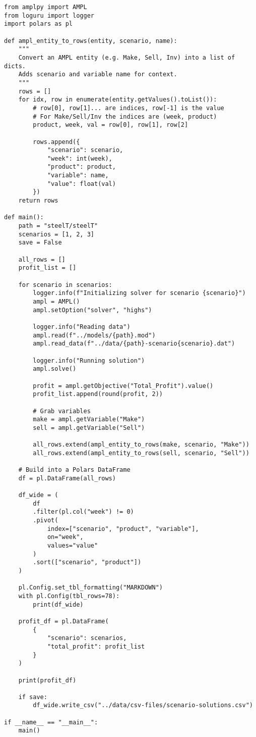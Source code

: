 \begin{verbatim}
from amplpy import AMPL
from loguru import logger
import polars as pl

def ampl_entity_to_rows(entity, scenario, name):
    """
    Convert an AMPL entity (e.g. Make, Sell, Inv) into a list of dicts.
    Adds scenario and variable name for context.
    """
    rows = []
    for idx, row in enumerate(entity.getValues().toList()):
        # row[0], row[1]... are indices, row[-1] is the value
        # For Make/Sell/Inv the indices are (week, product)
        product, week, val = row[0], row[1], row[2]

        rows.append({
            "scenario": scenario,
            "week": int(week),
            "product": product,
            "variable": name,
            "value": float(val)
        })
    return rows

def main():
    path = "steelT/steelT"
    scenarios = [1, 2, 3]
    save = False

    all_rows = []
    profit_list = []

    for scenario in scenarios:
        logger.info(f"Initializing solver for scenario {scenario}")
        ampl = AMPL()
        ampl.setOption("solver", "highs")

        logger.info("Reading data")
        ampl.read(f"../models/{path}.mod")
        ampl.read_data(f"../data/{path}-scenario{scenario}.dat")

        logger.info("Running solution")
        ampl.solve()

        profit = ampl.getObjective("Total_Profit").value()
        profit_list.append(round(profit, 2))

        # Grab variables
        make = ampl.getVariable("Make")
        sell = ampl.getVariable("Sell")

        all_rows.extend(ampl_entity_to_rows(make, scenario, "Make"))
        all_rows.extend(ampl_entity_to_rows(sell, scenario, "Sell"))

    # Build into a Polars DataFrame
    df = pl.DataFrame(all_rows)

    df_wide = (
        df
        .filter(pl.col("week") != 0)
        .pivot(
            index=["scenario", "product", "variable"],
            on="week",
            values="value"
        )
        .sort(["scenario", "product"])
    )

    pl.Config.set_tbl_formatting("MARKDOWN")
    with pl.Config(tbl_rows=78):
        print(df_wide)

    profit_df = pl.DataFrame(
        {
            "scenario": scenarios,
            "total_profit": profit_list
        }
    )

    print(profit_df)

    if save:
        df_wide.write_csv("../data/csv-files/scenario-solutions.csv")

if __name__ == "__main__":
    main()

\end{verbatim}